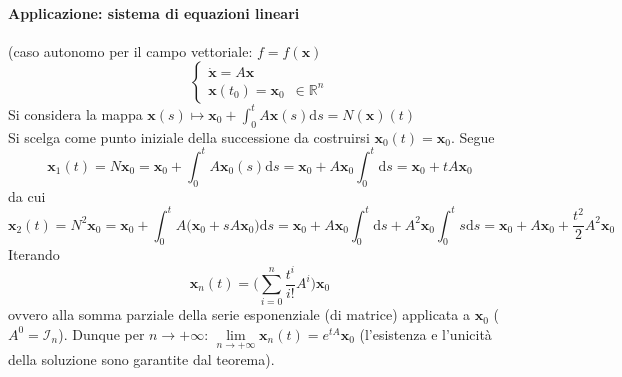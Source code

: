 \documentclass[10pt]{article}
\theoremstyle{plain}
\begin{document}
\paragraph{Applicazione: sistema di equazioni lineari}
(caso autonomo per il campo vettoriale: $f = f(\mathbf{x})$
\[\begin{cases}
\dot{\mathbf{x}} = A \mathbf{x}\\
\mathbf{x}(t_0) = \mathbf{x}_0 \enspace \in \mathbb{R}^n
\end{cases}\]
Si considera la mappa $\displaystyle \mathbf{x}(s) \longmapsto \mathbf{x}_0 + \int_{0}^{t}A \mathbf{x}(s)\textrm{d}s = N(\mathbf{x})(t)$
\\Si scelga come punto iniziale della successione da costruirsi $\mathbf{x}_0(t) = \mathbf{x}_0$. Segue 
\[\mathbf{x}_1(t) = N \mathbf{x}_0 = \mathbf{x}_0 + \int_{0}^{t}A  \mathbf{x}_0(s)\textrm{d}s = \mathbf{x}_0 + A \mathbf{x}_0\int_{0}^{t}\textrm{d}s = \mathbf{x}_0 + t A \mathbf{x}_0\]
da cui
\[\mathbf{x}_2(t) = N^2 \mathbf{x}_0 = \mathbf{x}_0 + \int_{0}^{t}A \big(\mathbf{x}_0 + sA\mathbf{x}_0\big)\textrm{d}s = \mathbf{x}_0 + A \mathbf{x}_0\int_{0}^{t}\textrm{d}s + A^2\mathbf{x}_0\int_{0}^{t}s\textrm{d}s = \mathbf{x}_0 + A \mathbf{x}_0 + \frac{t^2}{2}A^2 \mathbf{x}_0\]
Iterando
\[\mathbf{x}_n(t) = \big(\sum\limits_{i=0}^n \frac{t^i}{i!}A^i\big)\mathbf{x}_0\]
ovvero alla somma parziale della serie esponenziale (di matrice) applicata a $\mathbf{x}_0$ ($A^0 = \mathcal{I}_n$). Dunque per $n \rightarrow +\infty$: $\lim\limits_{n \rightarrow +\infty} \mathbf{x}_n(t) = e^{tA}\mathbf{x}_0$ (l'esistenza e l'unicità della soluzione sono garantite dal teorema).
\end{document}
